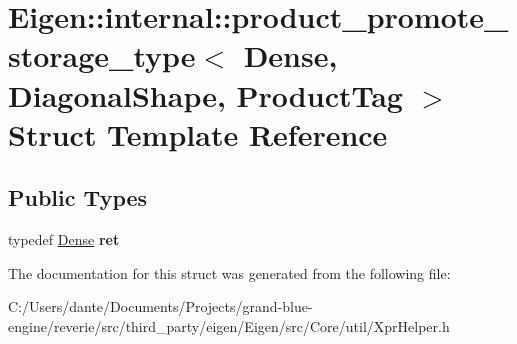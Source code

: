 \hypertarget{struct_eigen_1_1internal_1_1product__promote__storage__type_3_01_dense_00_01_diagonal_shape_00_01_product_tag_01_4}{}\section{Eigen\+::internal\+::product\+\_\+promote\+\_\+storage\+\_\+type$<$ Dense, Diagonal\+Shape, Product\+Tag $>$ Struct Template Reference}
\label{struct_eigen_1_1internal_1_1product__promote__storage__type_3_01_dense_00_01_diagonal_shape_00_01_product_tag_01_4}
\subsection*{Public Types}
\begin{DoxyCompactItemize}
\item 
\mbox{\label{struct_eigen_1_1internal_1_1product__promote__storage__type_3_01_dense_00_01_diagonal_shape_00_01_product_tag_01_4_acc40c9c92bbe0fa39119e1f13bdf3c7a}} 
typedef \mbox{\hyperlink{struct_eigen_1_1_dense}{Dense}} {\bfseries ret}
\end{DoxyCompactItemize}


The documentation for this struct was generated from the following file\+:\begin{DoxyCompactItemize}
\item 
C\+:/\+Users/dante/\+Documents/\+Projects/grand-\/blue-\/engine/reverie/src/third\+\_\+party/eigen/\+Eigen/src/\+Core/util/Xpr\+Helper.\+h\end{DoxyCompactItemize}
